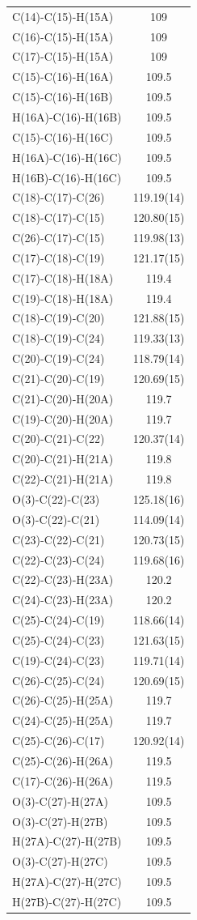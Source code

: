 \begin{center}
{\begin{supertabular}{p{1.5in}c}
C(14)-C(15)-H(15A)&109\\
C(16)-C(15)-H(15A)&109\\
C(17)-C(15)-H(15A)&109\\
C(15)-C(16)-H(16A)&109.5\\
C(15)-C(16)-H(16B)&109.5\\
H(16A)-C(16)-H(16B)&109.5\\
C(15)-C(16)-H(16C)&109.5\\
H(16A)-C(16)-H(16C)&109.5\\
H(16B)-C(16)-H(16C)&109.5\\
C(18)-C(17)-C(26)&119.19(14)\\
C(18)-C(17)-C(15)&120.80(15)\\
C(26)-C(17)-C(15)&119.98(13)\\
C(17)-C(18)-C(19)&121.17(15)\\
C(17)-C(18)-H(18A)&119.4\\
C(19)-C(18)-H(18A)&119.4\\
C(18)-C(19)-C(20)&121.88(15)\\
C(18)-C(19)-C(24)&119.33(13)\\
C(20)-C(19)-C(24)&118.79(14)\\
C(21)-C(20)-C(19)&120.69(15)\\
C(21)-C(20)-H(20A)&119.7\\
C(19)-C(20)-H(20A)&119.7\\
C(20)-C(21)-C(22)&120.37(14)\\
C(20)-C(21)-H(21A)&119.8\\
C(22)-C(21)-H(21A)&119.8\\
O(3)-C(22)-C(23)&125.18(16)\\
O(3)-C(22)-C(21)&114.09(14)\\
C(23)-C(22)-C(21)&120.73(15)\\
C(22)-C(23)-C(24)&119.68(16)\\
C(22)-C(23)-H(23A)&120.2\\
C(24)-C(23)-H(23A)&120.2\\
C(25)-C(24)-C(19)&118.66(14)\\
C(25)-C(24)-C(23)&121.63(15)\\
C(19)-C(24)-C(23)&119.71(14)\\
C(26)-C(25)-C(24)&120.69(15)\\
C(26)-C(25)-H(25A)&119.7\\
C(24)-C(25)-H(25A)&119.7\\
C(25)-C(26)-C(17)&120.92(14)\\
C(25)-C(26)-H(26A)&119.5\\
C(17)-C(26)-H(26A)&119.5\\
O(3)-C(27)-H(27A)&109.5\\
O(3)-C(27)-H(27B)&109.5\\
H(27A)-C(27)-H(27B)&109.5\\
O(3)-C(27)-H(27C)&109.5\\
H(27A)-C(27)-H(27C)&109.5\\
H(27B)-C(27)-H(27C)&109.5\\
\end{supertabular}
}
\end{center}

